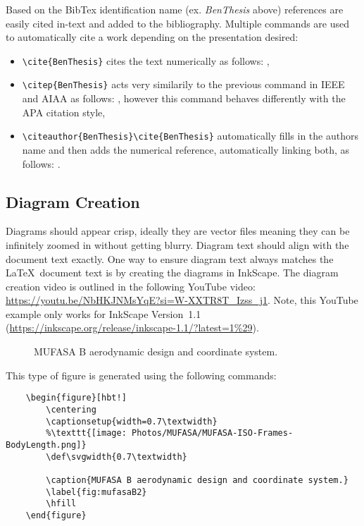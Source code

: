 Based on the BibTex identification name (ex. \textit{BenThesis} above) references are easily cited in-text and added to the bibliography. Multiple commands are used to automatically cite a work depending on the presentation desired:
\begin{itemize}
	\item \verb*|\cite{BenThesis}| cites the text numerically as follows: \cite{BenThesis},
	\item \verb*|\citep{BenThesis}| acts very similarily to the previous command in IEEE and AIAA as follows: \citep{BenThesis}, however this command behaves differently with the APA citation style, 
	\item \verb*|\citeauthor{BenThesis}\cite{BenThesis}| automatically fills in the authors name and then adds the numerical reference, automatically linking both, as follows: \citeauthor {BenThesis} \cite{BenThesis}.
\end{itemize}


\subsection{Diagram Creation} \label{sec:diagramCreation}

Diagrams should appear crisp, ideally they are vector files meaning they can be infinitely zoomed in without getting blurry. 
Diagram text should align with the document text exactly. One way to ensure diagram text always matches the \LaTeX\ document text is by creating the diagrams in InkScape. 
The diagram creation video is outlined in the following YouTube video: \url{https://youtu.be/NbHKJNMsYqE?si=W-XXTR8T_Izss_j1}. 
Note, this YouTube example only works for InkScape Version~1.1 (\url{https://inkscape.org/release/inkscape-1.1/?latest=1%29}). 

\begin{figure}[hbt!]
	\centering
	\captionsetup{width=0.7\textwidth}
	\def\svgwidth{0.7\textwidth}
	
	\caption{MUFASA B aerodynamic design and coordinate system.}
	\label{fig:mufasaB2}
	\hfill
\end{figure}

\noindent 
This type of figure is generated using the following commands: 

\begin{verbatim}
	\begin{figure}[hbt!]
		\centering
		\captionsetup{width=0.7\textwidth}
		%\texttt{[image: Photos/MUFASA/MUFASA-ISO-Frames-BodyLength.png]}
		\def\svgwidth{0.7\textwidth}
		
		\caption{MUFASA B aerodynamic design and coordinate system.}
		\label{fig:mufasaB2}
		\hfill
	\end{figure}
\end{verbatim}

